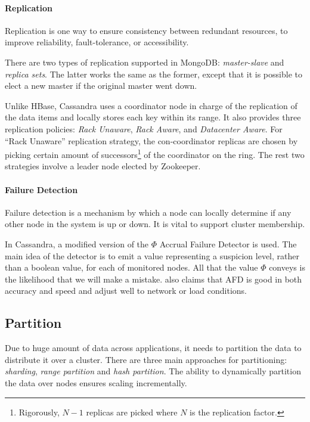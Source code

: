 \documentclass[12pt,letter]{article}
\begin{document}
\paragraph*{Replication}
Replication is one way to ensure consistency between redundant resources, to improve reliability, fault-tolerance, or accessibility. 

There are two types of replication supported in MongoDB: \textit{master-slave} and \textit{replica sets}.\citep{Suter2012} The latter works the same as the former, except that it is possible to elect a new master if the original master went down.

Unlike HBase, Cassandra uses a coordinator node in charge of the replication of the data items and locally stores each key within its range. It also provides three replication policies: \textit{Rack Unaware}, \textit{Rack Aware}, and \textit{Datacenter Aware}. For ``Rack Unaware'' replication strategy, the con-coordinator replicas are chosen by picking certain amount of successors\footnote{Rigorously, $N-1$ replicas are picked where $N$ is the replication factor.} of the coordinator on the ring. The rest two strategies involve a leader node elected by Zookeeper.\citep{Hunt2010}

\paragraph*{Failure Detection}
Failure detection is a mechanism by which a node can locally determine if any other node in the system is up or down. It is vital to support cluster membership.

In Cassandra, a modified version of the $\Phi$ Accrual Failure Detector is used. The main idea of the detector is to emit a value representing a suspicion level, rather than a boolean value, for each of monitored nodes. All that the value $\Phi$ conveys is the likelihood that we will make a mistake. \citep{LakshamAvinash2010} also claims that AFD is good in both accuracy and speed and adjust well to network or load conditions.

\subsection{Partition}
Due to huge amount of data across applications, it needs to partition the data to distribute it over a cluster. There are three main approaches for partitioning: \textit{sharding}, \textit{range partition} and \textit{hash partition}. The ability to dynamically partition the data over nodes ensures scaling incrementally. 
\end{document}

